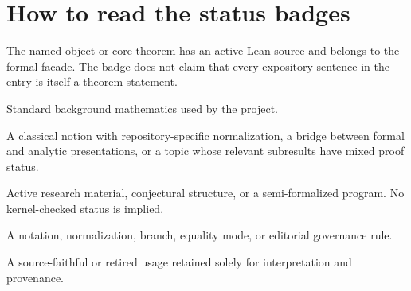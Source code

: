 \documentclass[11pt,oneside]{article}
\newcommand{\statusbox}[3]{%
  \begingroup\setlength{\fboxsep}{2.1pt}%
  \colorbox{#1}{\textcolor{#2}{\sffamily\bfseries\scriptsize\strut #3}}%
  \endgroup}
\newcommand{\statuslean}{\statusbox{leanfill}{leantext}{LEAN-PROVED}}
\newcommand{\statusclassical}{\statusbox{classicalfill}{classicaltext}{CLASSICAL}}
\newcommand{\statusmixed}{\statusbox{mixedfill}{mixedtext}{PROJECT / MIXED}}
\newcommand{\statusfrontier}{\statusbox{frontierfill}{frontiertext}{FRONTIER}}
\newcommand{\statusconvention}{\statusbox{conventionfill}{conventiontext}{CONVENTION}}
\newcommand{\statushistorical}{\statusbox{historicalfill}{historicaltext}{HISTORICAL}}
\begin{document}
\section*{How to read the status badges}
\begin{description}[leftmargin=3.5cm,style=nextline]
\item[\statuslean] The named object or core theorem has an active Lean source
and belongs to the formal facade.  The badge does not claim that every
expository sentence in the entry is itself a theorem statement.
\item[\statusclassical] Standard background mathematics used by the project.
\item[\statusmixed] A classical notion with repository-specific normalization,
a bridge between formal and analytic presentations, or a topic whose relevant
subresults have mixed proof status.
\item[\statusfrontier] Active research material, conjectural structure, or a
semi-formalized program.  No kernel-checked status is implied.
\item[\statusconvention] A notation, normalization, branch, equality mode, or
editorial governance rule.
\item[\statushistorical] A source-faithful or retired usage retained solely for
interpretation and provenance.
\end{description}

\tableofcontents
\newpage
\end{document}

